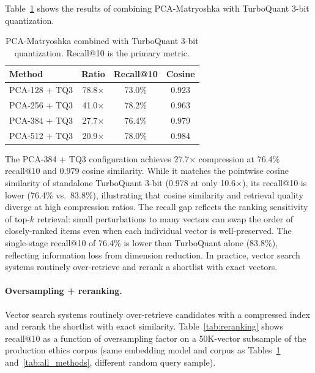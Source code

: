 \documentclass[journal]{IEEEtran}
\begin{document}
Table~\ref{tab:combined} shows the results of combining PCA-Matryoshka with TurboQuant 3-bit quantization.

\begin{table}[t]
  \centering
  \caption{PCA-Matryoshka combined with TurboQuant 3-bit quantization.
  Recall@10 is the primary metric.}
  \label{tab:combined}
  \begin{tabular}{lccc}
    \toprule
    \textbf{Method} & \textbf{Ratio} & \textbf{Recall@10} & \textbf{Cosine} \\
    \midrule
    PCA-128 + TQ3 & 78.8$\times$ & 73.0\% & 0.923 \\
    PCA-256 + TQ3 & 41.0$\times$ & 78.2\% & 0.963 \\
    PCA-384 + TQ3 & 27.7$\times$ & 76.4\% & 0.979 \\
    PCA-512 + TQ3 & 20.9$\times$ & 78.0\% & 0.984 \\
    \bottomrule
  \end{tabular}
\end{table}

The PCA-384 + TQ3 configuration achieves 27.7$\times$ compression at 76.4\% recall@10 and 0.979 cosine similarity.
While it matches the pointwise cosine similarity of standalone TurboQuant 3-bit (0.978 at only 10.6$\times$), its recall@10 is lower (76.4\% vs.\ 83.8\%), illustrating that cosine similarity and retrieval quality diverge at high compression ratios.
The recall gap reflects the ranking sensitivity of top-$k$ retrieval: small perturbations to many vectors can swap the order of closely-ranked items even when each individual vector is well-preserved.
The single-stage recall@10 of 76.4\% is lower than TurboQuant alone (83.8\%),
reflecting information loss from dimension reduction.  In practice, vector
search systems routinely over-retrieve and rerank a shortlist with exact
vectors.

\paragraph{Oversampling + reranking.}
Vector search systems routinely over-retrieve candidates with a compressed
index and rerank the shortlist with exact similarity.
Table~\ref{tab:reranking} shows recall@10 as a function of oversampling
factor on a 50K-vector subsample of the production ethics corpus (same
embedding model and corpus as Tables~\ref{tab:combined}
and~\ref{tab:all_methods}, different random query sample).
\end{document}
